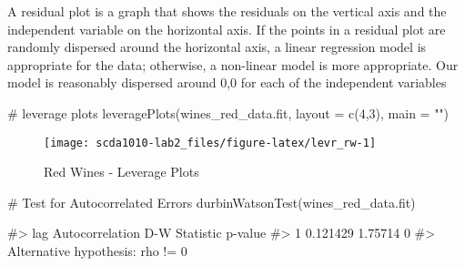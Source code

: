 A residual plot is a graph that shows the residuals on the vertical axis
and the independent variable on the horizontal axis. If the points in a
residual plot are randomly dispersed around the horizontal axis, a
linear regression model is appropriate for the data; otherwise, a
non-linear model is more appropriate. Our model is reasonably dispersed
around 0,0 for each of the independent variables

\begin{Schunk}
\begin{Sinput}
# leverage plots
leveragePlots(wines_red_data.fit, layout = c(4,3), main = "")
\end{Sinput}
\begin{figure}[h]

{\centering \texttt{[image: scda1010-lab2\_files/figure-latex/levr\_rw-1]} 

}

\caption[Red Wines - Leverage Plots]{Red Wines - Leverage Plots}\label{fig:levr_rw}
\end{figure}
\end{Schunk}

\begin{Schunk}
\begin{Sinput}
# Test for Autocorrelated Errors
durbinWatsonTest(wines_red_data.fit)
\end{Sinput}
\begin{Soutput}
#>  lag Autocorrelation D-W Statistic p-value
#>    1        0.121429       1.75714       0
#>  Alternative hypothesis: rho != 0
\end{Soutput}
\end{Schunk}

